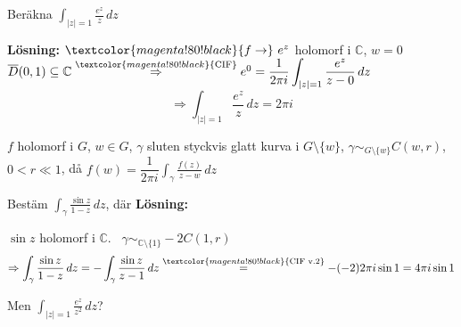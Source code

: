 \begin{example}
Beräkna $\displaystyle\int_{|z| = 1} \frac{e^z}{z}\,dz$

\textbf{Lösning:} $\textcolor{magenta!80!black}{f \to}\ e^z$ holomorf i $\mathbb{C}$, $w = 0$ \quad $\overline{D}(0, 1) \subseteq \mathbb{C} \overset{\textcolor{magenta!80!black}{\text{CIF}}}{\Rightarrow} e^0 = \dfrac{1}{2\pi i} \displaystyle\int_{|z| = 1} \frac{e^z}{z - 0}\,dz$
\[ \Rightarrow \int_{|z| = 1} \frac{e^z}{z}\,dz = 2\pi i \]
\end{example}

\begin{theorem}
$f$ holomorf i $G$, $w \in G$, $\gamma$ sluten styckvis glatt kurva i $G \setminus \{w\}$, $\gamma \sim_{G \setminus \{w\}} C(w, r)$, $0 < r \ll 1$, då $f(w) = \dfrac{1}{2\pi i} \displaystyle\int_\gamma \frac{f(z)}{z - w}\,dz$
\end{theorem}

\begin{example}
Bestäm $\displaystyle\int_\gamma \frac{\sin z}{1 - z}\,dz$, där
\textbf{Lösning:}

$\sin z$ holomorf i $\mathbb{C}$. \ $\gamma \sim_{\mathbb{C} \setminus \{1\}} -2C(1, r)$
\[ \Rightarrow \int_\gamma \frac{\sin z}{1 - z}\,dz = -\int_\gamma \frac{\sin z}{z - 1}\,dz \overset{\textcolor{magenta!80!black}{\text{CIF v.2}}}{=} -(-2)2\pi i \sin 1 = 4\pi i \sin 1 \]
\end{example}

\textcolor{red!70!black}{Men} $\displaystyle\int_{|z| = 1} \frac{e^z}{z^2}\,dz$?

